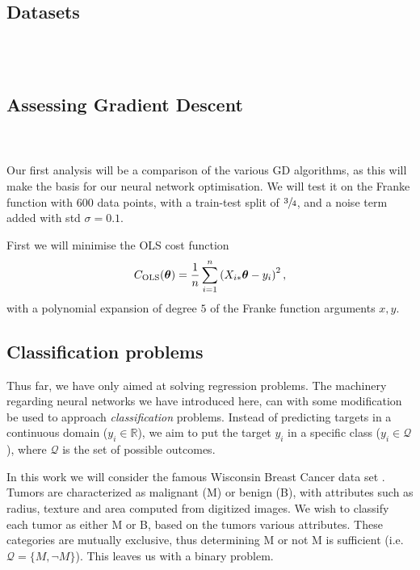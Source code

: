 \\
\subsection{Datasets}
    \\
    \\

\subsection{Assessing Gradient Descent}
    \\
    \\
    Our first analysis will be a comparison of the various GD algorithms, as this will make the basis for our neural network optimisation. We will test it on the Franke function with 600 data points, with a train-test split of $\sfrac{3}{4}$, and a noise term added with std $\sigma=0.1$.

    First we will minimise the OLS cost function
    \begin{align}
        {C}_\text{OLS}(\boldsymbol{\theta}) = \frac{1}{n}\sum_{i=1}^n \left(X_{i*}\boldsymbol{\theta} - y_i\right)^2,
    \end{align}
    with a polynomial expansion of degree $5$ of the Franke function arguments $x,y$. 


\subsection{Classification problems}
    Thus far, we have only aimed at solving regression problems. The machinery regarding neural networks we have introduced here, can with some modification be used to approach \textit{classification} problems. Instead of predicting targets in a continuous domain ($y_i \in \mathbb{R}$), we aim to put the target $y_i$ in a specific class ($y_i \in \mathcal{Q}$), where $\mathcal{Q}$ is the set of possible outcomes. 

    In this work we will consider the famous Wisconsin Breast Cancer data set \cite{Dua:2019}. Tumors are characterized as malignant (M) or benign (B), with attributes such as radius, texture and area computed from digitized images. We wish to classify each tumor as either M or B, based on the tumors various attributes. These categories are mutually exclusive, thus determining M or not M is sufficient (i.e. $\mathcal{Q} = \{ M, \neg M \}$). This leaves us with a binary problem. 

